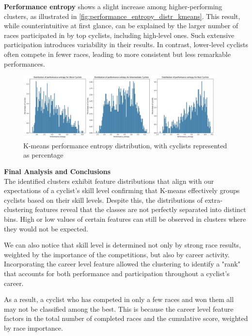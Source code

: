 \noindent  
\textbf{Performance entropy} shows a slight increase among higher-performing clusters, as illustrated in \autoref{fig:performance_entropy_distr_kmeans}. This result, while counterintuitive at first glance, can be explained by the larger number of races participated in by top cyclists, including high-level ones. Such extensive participation introduces variability in their results. In contrast, lower-level cyclists often compete in fewer races, leading to more consistent but less remarkable performances.  

\begin{figure}[H]  
\centering  
\includegraphics[width=0.93\textwidth]{images/CLUSTER/k-means/performance_entropy_distr.png}  
\caption{ \small K-means performance entropy distribution, with cyclists represented as percentage}  
\label{fig:performance_entropy_distr_kmeans}  
\end{figure}  


\noindent
\textbf{Final Analysis and Conclusions}\\
The identified clusters exhibit feature distributions that align with our expectations of a cyclist’s skill level confirming that K-means effectively groups cyclists based on their skill levels. Despite this, the distributions of extra-clustering features reveal that the classes are not perfectly separated into distinct bins. High or low values of certain features can still be observed in clusters where they would not be expected.

We can also notice that skill level is determined not only by strong race results, weighted by the importance of the competitions, but also by career activity. Incorporating the career level feature allowed the clustering to identify a "rank" that accounts for both performance and participation throughout a cyclist’s career.  

As a result, a cyclist who has competed in only a few races and won them all may not be classified among the best. This is because the career level feature factors in the total number of completed races and the cumulative score, weighted by race importance. \\


